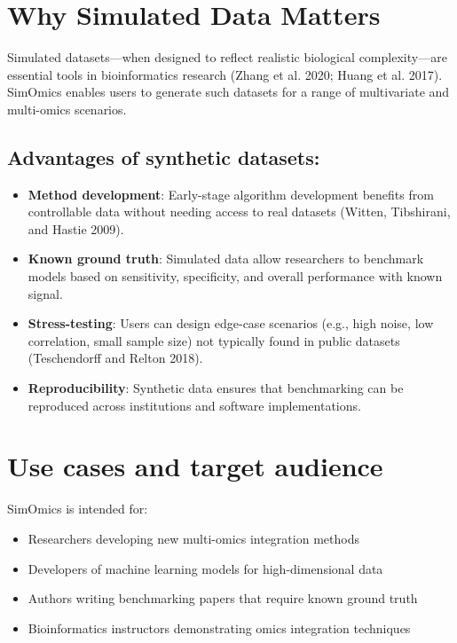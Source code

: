 \documentclass[
]{article}
\providecommand{\tightlist}{%
  \setlength{\itemsep}{0pt}\setlength{\parskip}{0pt}}
\begin{document}
\section{Why Simulated Data Matters}\label{why-simulated-data-matters}

Simulated datasets---when designed to reflect realistic biological
complexity---are essential tools in bioinformatics research (Zhang et
al. 2020; Huang et al. 2017). SimOmics enables users to generate such
datasets for a range of multivariate and multi-omics scenarios.

\subsection{Advantages of synthetic
datasets:}\label{advantages-of-synthetic-datasets}

\begin{itemize}
\tightlist
\item
  \textbf{Method development}: Early-stage algorithm development
  benefits from controllable data without needing access to real
  datasets (Witten, Tibshirani, and Hastie 2009).
\item
  \textbf{Known ground truth}: Simulated data allow researchers to
  benchmark models based on sensitivity, specificity, and overall
  performance with known signal.
\item
  \textbf{Stress-testing}: Users can design edge-case scenarios (e.g.,
  high noise, low correlation, small sample size) not typically found in
  public datasets (Teschendorff and Relton 2018).
\item
  \textbf{Reproducibility}: Synthetic data ensures that benchmarking can
  be reproduced across institutions and software implementations.
\end{itemize}

\section{Use cases and target
audience}\label{use-cases-and-target-audience}

SimOmics is intended for:

\begin{itemize}
\tightlist
\item
  Researchers developing new multi-omics integration methods
\item
  Developers of machine learning models for high-dimensional data
\item
  Authors writing benchmarking papers that require known ground truth
\item
  Bioinformatics instructors demonstrating omics integration techniques
\end{itemize}
\end{document}
